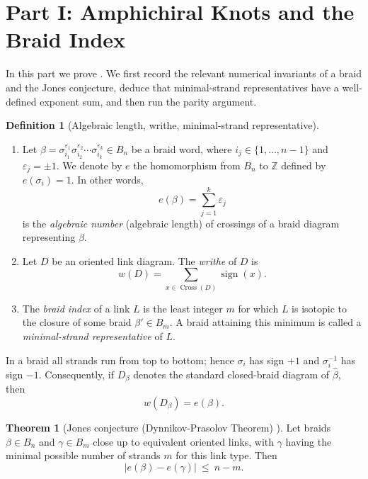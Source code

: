\documentclass[11pt]{article}
\theoremstyle{definition}
\newtheorem{theorem}{Theorem}[section]
\newtheorem{definition}[definition]{Definition}
\begin{document}
\section{Part I: Amphichiral Knots and the Braid Index}\label{sec:partI}

\noindent In this part we prove . We first record the relevant numerical
invariants of a braid and the Jones conjecture, deduce that minimal-strand
representatives have a well-defined exponent sum, and then run the parity argument.

\begin{definition}[Algebraic length, writhe, minimal-strand representative]\label{def:length}
\leavevmode
\begin{enumerate}[label=\textup{(\alph*)}]
\item Let $\beta=\sigma_{i_1}^{\varepsilon_1}\sigma_{i_2}^{\varepsilon_2}\cdots
\sigma_{i_k}^{\varepsilon_k}\in B_{n}$ be a braid word, where $i_j\in\{1,\dots,n-1\}$
and $\varepsilon_j=\pm1$. We denote by $e$ the homomorphism from $B_{n}$ to $\mathbb{Z}$ defined by
$e(\sigma_{i})=1$. In other words,
\[
e(\beta)=\sum_{j=1}^{k}\varepsilon_j
\]
is the \emph{algebraic number} (algebraic length) of crossings of a braid
diagram representing $\beta$.
\item Let $D$ be an oriented link diagram. The \emph{writhe} of $D$ is
\[
w(D)=\sum_{x\in\operatorname{Cross}(D)}\operatorname{sign}(x).
\]
\item The \emph{braid index} of a link $L$ is the least integer $m$ for which $L$
is isotopic to the closure of some braid $\beta'\in B_{m}$. A braid attaining this
minimum is called a \emph{minimal-strand representative} of $L$.

\end{enumerate}
In a braid all strands run from top to bottom; hence $\sigma_{i}$ has sign $+1$ and
$\sigma_{i}^{-1}$ has sign $-1$. Consequently, if $D_\beta$ denotes the standard
closed-braid diagram of $\widehat{\beta}$, then
\[
w(D_\beta)=e(\beta).
\]
\end{definition}

\begin{theorem}[Jones conjecture (Dynnikov-Prasolov Theorem) {\cite[Theorem~9]{DP2013}}]\label{thm:jones}
Let braids $\beta\in B_{n}$ and $\gamma\in B_{m}$ close up to equivalent oriented
links, with $\gamma$ having the minimal possible number of strands $m$ for this
link type. Then
\[
\bigl|e(\beta)-e(\gamma)\bigr|\ \le\ n-m .
\]
\end{theorem}
\end{document}
